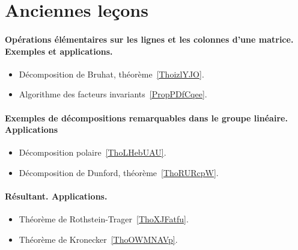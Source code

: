 
\section{Anciennes leçons}

\paragraph{Opérations élémentaires sur les lignes et les colonnes d’une matrice. Exemples et applications.}
\begin{itemize}
    \item Décomposition de Bruhat, théorème~\ref{ThoizlYJO}.
    \item Algorithme des facteurs invariants~\ref{PropPDfCqee}.
\end{itemize}

\paragraph{Exemples de décompositions remarquables dans le groupe linéaire. Applications}
\begin{itemize}
    \item Décomposition polaire~\ref{ThoLHebUAU}.
    \item Décomposition de Dunford, théorème~\ref{ThoRURcpW}.
\end{itemize}
\paragraph{Résultant. Applications.}
\begin{itemize}
    \item Théorème de Rothstein-Trager~\ref{ThoXJFatfu}.
    \item Théorème de Kronecker~\ref{ThoOWMNAVp}.
\end{itemize}
